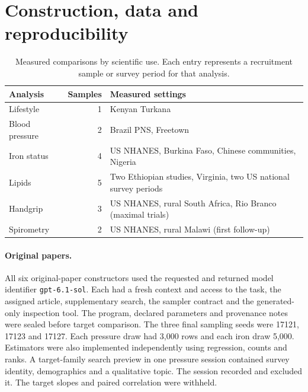 \section{Construction, data and reproducibility}
\label{app:design}
\begin{table}[htbp]
\caption{Measured comparisons by scientific use. Each entry represents a recruitment sample or survey period for that analysis.}
\label{tab:scope}
\small\centering
\begin{tabular}{@{}lrp{}@{}}
\toprule
Analysis & Samples & Measured settings\\
\midrule
Lifestyle & 1 & Kenyan Turkana\\
Blood pressure & 2 & Brazil PNS, Freetown\\
Iron status & 4 & US NHANES, Burkina Faso, Chinese communities, Nigeria\\
Lipids & 5 & Two Ethiopian studies, Virginia, two US national survey periods\\
Handgrip & 3 & US NHANES, rural South Africa, Rio Branco (maximal trials)\\
Spirometry & 2 & US NHANES, rural Malawi (first follow-up)\\
\bottomrule
\end{tabular}
\end{table}

\paragraph{Original papers.}
All six original-paper constructors used the requested and returned model identifier \texttt{gpt-6.1-sol}. Each had a fresh context and access to the task, the assigned article, supplementary search, the sampler contract and the generated-only inspection tool. The program, declared parameters and provenance notes were sealed before target comparison. The three final sampling seeds were 17121, 17123 and 17127. Each pressure draw had 3,000 rows and each iron draw 5,000. Estimators were also implemented independently using regression, counts and ranks. A target-family search preview in one pressure session contained survey identity, demographics and a qualitative topic. The session recorded and excluded it. The target slopes and paired correlation were withheld.

